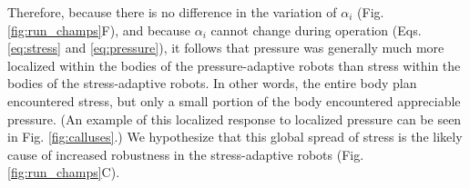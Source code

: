 Therefore, because there is no difference in the variation of $\alpha_i$ (Fig. \ref{fig:run_champs}F), and because  $\alpha_i$ cannot change during operation (Eqs. \ref{eq:stress} and \ref{eq:pressure}), it follows that pressure was generally much more localized within
the bodies of the pressure-adaptive robots than stress within the bodies of the stress-adaptive robots.
In other words, the entire body plan encountered stress, but only a small portion of the body encountered appreciable pressure.
(An example of this localized response to localized pressure can be seen in Fig. \ref{fig:calluses}.)
We hypothesize that this global spread of stress is the likely cause of increased robustness in the stress-adaptive robots
(Fig. \ref{fig:run_champs}C).








